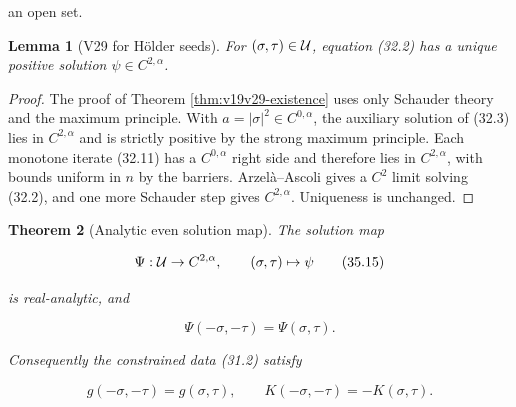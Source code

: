 \documentclass[11pt]{article}
\newtheorem{theorem}{Theorem}[section]
\newtheorem{lemma}[theorem]{Lemma}
\theoremstyle{remark}
\begin{document}
an open set.

\begin{lemma}[V29 for H\"older seeds]
\label{lem:v19v32-hoelder}
For \((\sigma,\tau)\in{\cal U}\), equation (32.2) has a unique positive
solution \(\psi\in C^{2,\alpha}\).
\end{lemma}

\begin{proof}
The proof of Theorem \ref{thm:v19v29-existence} uses only Schauder
theory and the maximum principle.  With \(a=|\sigma|^2\in C^{0,\alpha}\),
the auxiliary solution of (32.3) lies in \(C^{2,\alpha}\) and is
strictly positive by the strong maximum principle.  Each monotone
iterate (32.11) has a \(C^{0,\alpha}\) right side and therefore lies in
\(C^{2,\alpha}\), with bounds uniform in \(n\) by the barriers.
Arzel\`a--Ascoli gives a \(C^2\) limit solving (32.2), and one more
Schauder step gives \(C^{2,\alpha}\).  Uniqueness is unchanged.
\end{proof}

\begin{theorem}[Analytic even solution map]
\label{thm:v19v32-analytic}
The solution map

\[
 \Psi:{\cal U}\to C^{2,\alpha},\qquad
 (\sigma,\tau)\mapsto\psi                                         \tag{35.15}
\]

is real-analytic, and

\[
 \Psi(-\sigma,-\tau)=\Psi(\sigma,\tau).                          \tag{35.16}
\]

Consequently the constrained data (31.2) satisfy

\[
 g(-\sigma,-\tau)=g(\sigma,\tau),\qquad
 K(-\sigma,-\tau)=-K(\sigma,\tau).                                \tag{35.17}
\]
\end{theorem}
\end{document}
